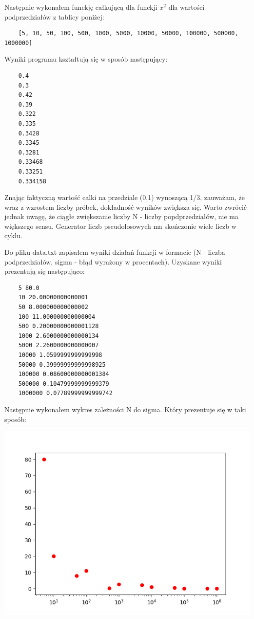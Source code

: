 \documentclass[5]{article}
\begin{document}
Następnie wykonałem funckję całkującą dla funckji $x^2$ dla wartości podprzedziałów z tablicy poniżej:
\begin{verbatim}
    [5, 10, 50, 100, 500, 1000, 5000, 10000, 50000, 100000, 500000, 1000000]
\end{verbatim}

Wyniki programu kształtują się w sposób następujący:
\begin{verbatim}
    0.4
    0.3 
    0.42
    0.39
    0.322
    0.335
    0.3428
    0.3345
    0.3281
    0.33468
    0.33251
    0.334158
\end{verbatim}

Znając faktyczną wartość calki na przedziale (0,1) wynoszącą 1/3, zauważam, że wraz z wzrostem liczby próbek, dokładność wyników zwiększa się. Warto zwrócić jednak uwagę, że ciągłe zwiększanie liczby N - liczby popdprzedziałów, nie ma większego sensu. Generator liczb pseudolosowych ma skończonie wiele liczb w cyklu.

\vspace{4mm}
Do pliku data.txt zapisałem wyniki działań funkcji w formacie (N - liczba podprzedziałów, sigma - błąd wyrażony w procentach). Uzyskane wyniki prezentują się następująco:
\begin{verbatim}
    5 80.0
    10 20.00000000000001   
    50 8.000000000000002   
    100 11.000000000000004 
    500 0.20000000000001128
    1000 2.6000000000000134
    5000 2.2600000000000007
    10000 1.0599999999999998 
    50000 0.39999999999998925
    100000 0.08600000000001384
    500000 0.10479999999999379
    1000000 0.07789999999999742
\end{verbatim}
\vspace{4mm}

Następnie wykonałem wykres zależności N do sigma. Który prezentuje się w taki sposób:

\begin{center}
    \includegraphics[scale=0.7]{Figure_1.png} \par
    \vspace{3mm}
\end{center}
\end{document}
